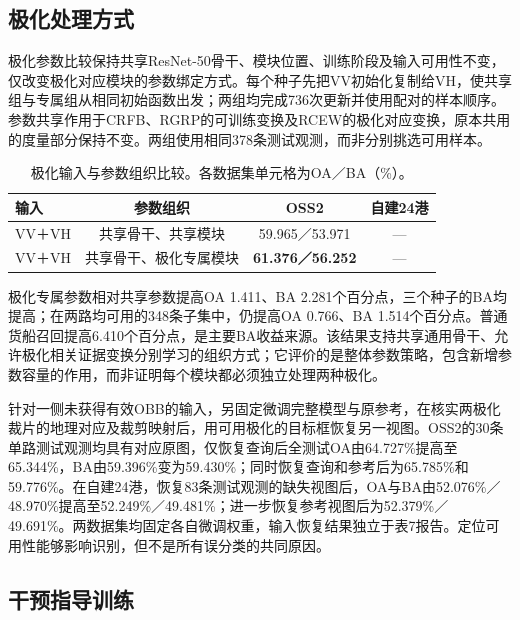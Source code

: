 \documentclass[journal,10pt,a4paper]{IEEEtran}
\begin{document}
\subsection{极化处理方式}\label{ux6781ux5316ux5904ux7406ux65b9ux5f0f}

极化参数比较保持共享ResNet-50骨干、模块位置、训练阶段及输入可用性不变，仅改变极化对应模块的参数绑定方式。每个种子先把VV初始化复制给VH，使共享组与专属组从相同初始函数出发；两组均完成736次更新并使用配对的样本顺序。参数共享作用于CRFB、RGRP的可训练变换及RCEW的极化对应变换，原本共用的度量部分保持不变。两组使用相同378条测试观测，而非分别挑选可用样本。

\begin{table}[H]
\centering\footnotesize
\setcounter{table}{14}
\caption{极化输入与参数组织比较。各数据集单元格为OA／BA（\%）。}
\label{tab:15}
\setlength{\tabcolsep}{3pt}\renewcommand{\arraystretch}{1.2}
\begin{tabularx}{\linewidth}{LCCC}
\toprule
输入 & 参数组织 & OSS2 & 自建24港 \\
\midrule
VV＋VH & 共享骨干、共享模块 & 59.965／53.971 & --- \\
VV＋VH & 共享骨干、极化专属模块 & \textbf{61.376／56.252} & --- \\
\bottomrule
\end{tabularx}
\end{table}

极化专属参数相对共享参数提高OA 1.411、BA 2.281个百分点，三个种子的BA均提高；在两路均可用的348条子集中，仍提高OA 0.766、BA 1.514个百分点。普通货船召回提高6.410个百分点，是主要BA收益来源。该结果支持共享通用骨干、允许极化相关证据变换分别学习的组织方式；它评价的是整体参数策略，包含新增参数容量的作用，而非证明每个模块都必须独立处理两种极化。

针对一侧未获得有效OBB的输入，另固定微调完整模型与原参考，在核实两极化裁片的地理对应及裁剪映射后，用可用极化的目标框恢复另一视图。OSS2的30条单路测试观测均具有对应原图，仅恢复查询后全测试OA由64.727\%提高至65.344\%，BA由59.396\%变为59.430\%；同时恢复查询和参考后为65.785\%和59.776\%。在自建24港，恢复83条测试观测的缺失视图后，OA与BA由52.076\%／48.970\%提高至52.249\%／49.481\%；进一步恢复参考视图后为52.379\%／49.691\%。两数据集均固定各自微调权重，输入恢复结果独立于表7报告。定位可用性能够影响识别，但不是所有误分类的共同原因。

\subsection{干预指导训练}\label{ux5e72ux9884ux6307ux5bfcux8badux7ec3}
\end{document}
